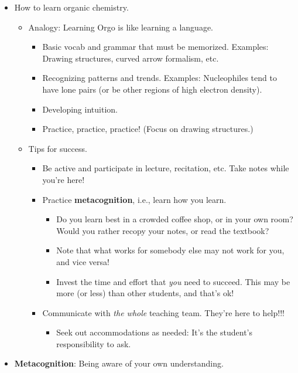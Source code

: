 \documentclass[../notes.tex]{subfiles}
\begin{document}
\begin{itemize}
\begin{itemize}
    \end{itemize}
    \item How to learn organic chemistry.
    \begin{itemize}
        \item Analogy: Learning Orgo is like learning a language.
        \begin{itemize}
            \item Basic vocab and grammar that must be memorized. Examples: Drawing structures, curved arrow formalism, etc.
            \item Recognizing patterns and trends. Examples: Nucleophiles tend to have lone pairs (or be other regions of high electron density).
            \item Developing intuition.
            \item Practice, practice, practice! (Focus on drawing structures.)
        \end{itemize}
        \item Tips for success.
        \begin{itemize}
            \item Be active and participate in lecture, recitation, etc. Take notes while you're here!
            \item Practice \textbf{metacognition}, i.e., learn how you learn.
            \begin{itemize}
                \item Do you learn best in a crowded coffee shop, or in your own room? Would you rather recopy your notes, or read the textbook?
                \item Note that what works for somebody else may not work for you, and vice versa!
                \item Invest the time and effort that \emph{you} need to succeed. This may be more (or less) than other students, and that's ok!
            \end{itemize}
            \item Communicate with \emph{the whole} teaching team. They're here to help!!!
            \begin{itemize}
                \item Seek out accommodations as needed: It's the student's responsibility to ask.
            \end{itemize}
        \end{itemize}
    \end{itemize}
    \item \textbf{Metacognition}: Being aware of your own understanding.

\end{itemize}
\end{document}
